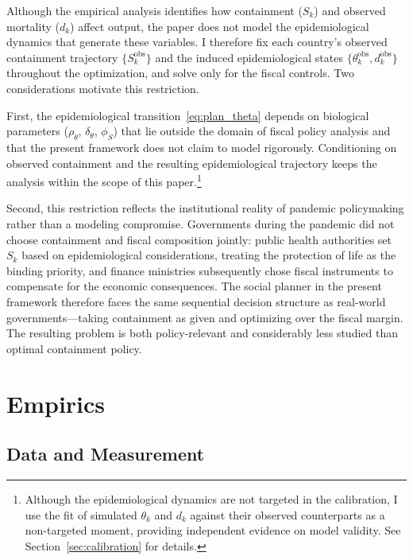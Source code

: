 \documentclass[12pt, a4paper]{article}
\begin{document}
Although the empirical analysis identifies how containment ($S_k$) and observed mortality ($d_k$) affect output, the paper does not model the epidemiological dynamics that generate these variables. I therefore fix each country's observed containment trajectory $\{S_k^{\text{obs}}\}$ and the induced epidemiological states $\{\theta_k^{\text{obs}}, d_k^{\text{obs}}\}$ throughout the optimization, and solve only for the fiscal controls. Two considerations motivate this restriction.

First, the epidemiological transition~\eqref{eq:plan_theta} depends on biological parameters ($\rho_\theta$, $\delta_\theta$, $\phi_S$) that lie outside the domain of fiscal policy analysis and that the present framework does not claim to model rigorously. Conditioning on observed containment and the resulting epidemiological trajectory keeps the analysis within the scope of this paper.\footnote{Although the epidemiological dynamics are not targeted in the calibration, I use the fit of simulated $\theta_k$ and $d_k$ against their observed counterparts as a non-targeted moment, providing independent evidence on model validity. See Section~\ref{sec:calibration} for details.}

Second, this restriction reflects the institutional reality of pandemic policymaking rather than a modeling compromise. Governments during the pandemic did not choose containment and fiscal composition jointly: public health authorities set $S_k$ based on epidemiological considerations, treating the protection of life as the binding priority, and finance ministries subsequently chose fiscal instruments to compensate for the economic consequences. The social planner in the present framework therefore faces the same sequential decision structure as real-world governments---taking containment as given and optimizing over the fiscal margin. The resulting problem is both policy-relevant and considerably less studied than optimal containment policy.




\section{Empirics}
\label{sec:estimation}

\subsection{Data and Measurement}
\label{subsec:data}
\end{document}
